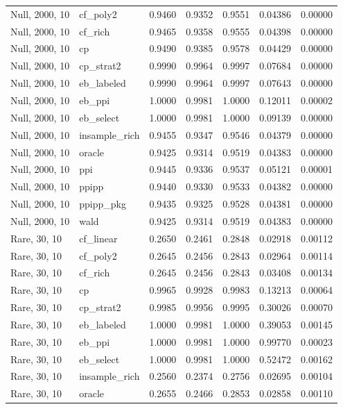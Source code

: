 \begin{longtable}{llrrrrr}
Null, 2000, 10 & cf\_poly2 & 0.9460 & 0.9352 & 0.9551 & 0.04386 & 0.00000 \\
Null, 2000, 10 & cf\_rich & 0.9465 & 0.9358 & 0.9555 & 0.04398 & 0.00000 \\
Null, 2000, 10 & cp & 0.9490 & 0.9385 & 0.9578 & 0.04429 & 0.00000 \\
Null, 2000, 10 & cp\_strat2 & 0.9990 & 0.9964 & 0.9997 & 0.07684 & 0.00000 \\
Null, 2000, 10 & eb\_labeled & 0.9990 & 0.9964 & 0.9997 & 0.07643 & 0.00000 \\
Null, 2000, 10 & eb\_ppi & 1.0000 & 0.9981 & 1.0000 & 0.12011 & 0.00002 \\
Null, 2000, 10 & eb\_select & 1.0000 & 0.9981 & 1.0000 & 0.09139 & 0.00000 \\
Null, 2000, 10 & insample\_rich & 0.9455 & 0.9347 & 0.9546 & 0.04379 & 0.00000 \\
Null, 2000, 10 & oracle & 0.9425 & 0.9314 & 0.9519 & 0.04383 & 0.00000 \\
Null, 2000, 10 & ppi & 0.9445 & 0.9336 & 0.9537 & 0.05121 & 0.00001 \\
Null, 2000, 10 & ppipp & 0.9440 & 0.9330 & 0.9533 & 0.04382 & 0.00000 \\
Null, 2000, 10 & ppipp\_pkg & 0.9435 & 0.9325 & 0.9528 & 0.04381 & 0.00000 \\
Null, 2000, 10 & wald & 0.9425 & 0.9314 & 0.9519 & 0.04383 & 0.00000 \\
Rare, 30, 10 & cf\_linear & 0.2650 & 0.2461 & 0.2848 & 0.02918 & 0.00112 \\
Rare, 30, 10 & cf\_poly2 & 0.2645 & 0.2456 & 0.2843 & 0.02964 & 0.00114 \\
Rare, 30, 10 & cf\_rich & 0.2645 & 0.2456 & 0.2843 & 0.03408 & 0.00134 \\
Rare, 30, 10 & cp & 0.9965 & 0.9928 & 0.9983 & 0.13213 & 0.00064 \\
Rare, 30, 10 & cp\_strat2 & 0.9985 & 0.9956 & 0.9995 & 0.30026 & 0.00070 \\
Rare, 30, 10 & eb\_labeled & 1.0000 & 0.9981 & 1.0000 & 0.39053 & 0.00145 \\
Rare, 30, 10 & eb\_ppi & 1.0000 & 0.9981 & 1.0000 & 0.99770 & 0.00023 \\
Rare, 30, 10 & eb\_select & 1.0000 & 0.9981 & 1.0000 & 0.52472 & 0.00162 \\
Rare, 30, 10 & insample\_rich & 0.2560 & 0.2374 & 0.2756 & 0.02695 & 0.00104 \\
Rare, 30, 10 & oracle & 0.2655 & 0.2466 & 0.2853 & 0.02858 & 0.00110 \\

\end{longtable}
